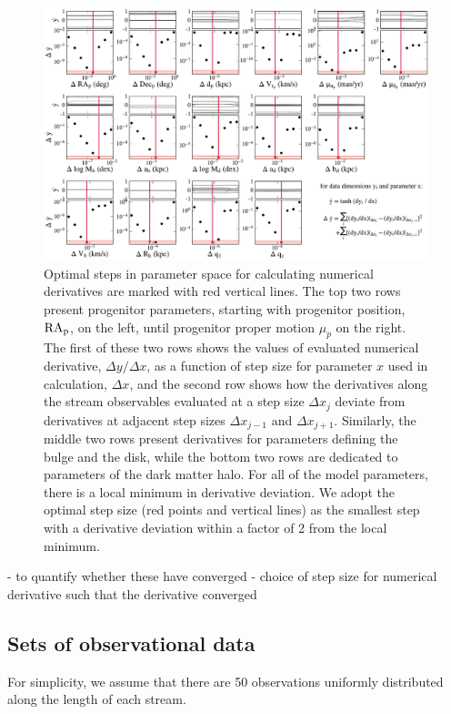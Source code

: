 \documentclass[modern]{aastex61}
\begin{document}
\begin{figure}
\begin{center}
\includegraphics[width=\textwidth]{derivative_steps.pdf}
\caption{Optimal steps in parameter space for calculating numerical derivatives are marked with red vertical lines.
The top two rows present progenitor parameters, starting with progenitor position, $\rm RA_p$, on the left, until progenitor proper motion $\mu_p$ on the right.
The first of these two rows shows the values of evaluated numerical derivative, $\Delta y/\Delta x$, as a function of step size for parameter $x$ used in calculation, $\Delta x$, and the second row shows how the derivatives along the stream observables evaluated at a step size $\Delta x_j$ deviate from derivatives at adjacent step sizes $\Delta x_{j-1}$ and $\Delta x_{j+1}$.
Similarly, the middle two rows present derivatives for parameters defining the bulge and the disk, while the bottom two rows are dedicated to parameters of the dark matter halo.
For all of the model parameters, there is a local minimum in derivative deviation.
We adopt the optimal step size (red points and vertical lines) as the smallest step with a derivative deviation within a factor of 2 from the local minimum.
}
\label{fig:derivative_conv}
\end{center}
\end{figure}

- to quantify whether these have converged
- choice of step size for numerical derivative such that the derivative converged

\subsection{Sets of observational data}
For simplicity, we assume that there are 50 observations uniformly distributed along the length of each stream.
\end{document}
